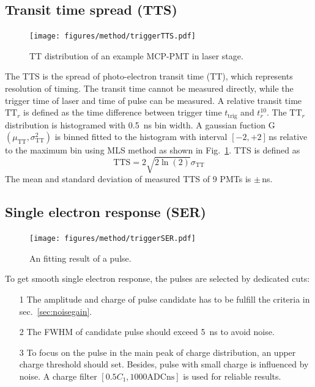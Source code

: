 \subsection{Transit time spread (TTS)}
\begin{figure}[!htbp]
    \centering
    \texttt{[image: figures/method/triggerTTS.pdf]}
    \caption{TT distribution of an example MCP-PMT in laser stage.}
    \label{fig:triggerTTS}
\end{figure}
The TTS is the spread of photo-electron transit time (TT), which represents resolution of timing. The transit time cannot be measured directly, while the trigger time of laser and time of pulse can be measured. A relative transit time $\mathrm{TT}_r$ is defined as the time difference between trigger time $t_{\mathrm{trig}}$ and $t_r^{10}$. The $\mathrm{TT}_r$ distribution is histogramed with \SI{0.5}{ns} bin width. A gaussian fuction G$(\mu_{\mathrm{TT}},\sigma_{\mathrm{TT}}^2)$ is binned fitted to the histogram with interval $[-2,+2]$\,ns relative to the maximum bin using MLS method as shown in Fig.~\ref{fig:triggerTTS}.
TTS is defined as
\begin{equation}
    \mathrm{TTS}=2\sqrt{2\ln(2)}\sigma_{\mathrm{TT}}
\end{equation}
The mean and standard deviation of measured TTS of 9 PMTs is $\pm$\,ns.
\subsection{Single electron response (SER)}
\begin{figure}
    \centering
    \texttt{[image: figures/method/triggerSER.pdf]}
    \caption{An fitting result of a pulse.}
    \label{fig:triggerser}
\end{figure}
To get smooth single electron response, the pulses are selected by dedicated cuts:
\begin{itemize}
    \item[1] The amplitude and charge of pulse candidate has to be fulfill the criteria in sec.~\ref{sec:noisegain}.
    \item[2] The FWHM of candidate pulse should exceed \SI{5}{ns} to avoid noise.
    \item[3] To focus on the pulse in the main peak of charge distribution, an upper charge threshold should set. Besides, pulse with small charge is influenced by noise. A charge filter $[0.5C_1, 1000\mathrm{ADCns}]$ is used for reliable results.
\end{itemize}

